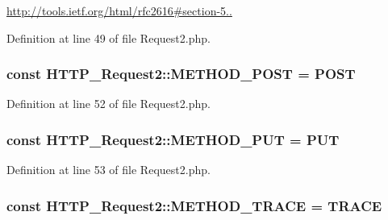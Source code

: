 \hyperlink{}{http\+://tools.\+ietf.\+org/html/rfc2616\#section-\/5..}

Definition at line 49 of file Request2.\+php.

\subsubsection[{\texorpdfstring{M\+E\+T\+H\+O\+D\+\_\+\+P\+O\+ST}{METHOD_POST}}]{\setlength{\rightskip}{0pt plus 5cm}const H\+T\+T\+P\+\_\+\+Request2\+::\+M\+E\+T\+H\+O\+D\+\_\+\+P\+O\+ST = \textquotesingle{}P\+O\+ST\textquotesingle{}}\hypertarget{classHTTP__Request2_ae42a6ae396ef8abacf8e54a64a64df22}{}\label{classHTTP__Request2_ae42a6ae396ef8abacf8e54a64a64df22}


Definition at line 52 of file Request2.\+php.

\subsubsection[{\texorpdfstring{M\+E\+T\+H\+O\+D\+\_\+\+P\+UT}{METHOD_PUT}}]{\setlength{\rightskip}{0pt plus 5cm}const H\+T\+T\+P\+\_\+\+Request2\+::\+M\+E\+T\+H\+O\+D\+\_\+\+P\+UT = \textquotesingle{}P\+UT\textquotesingle{}}\hypertarget{classHTTP__Request2_a02fd90821d762476b8ec1e226c374174}{}\label{classHTTP__Request2_a02fd90821d762476b8ec1e226c374174}


Definition at line 53 of file Request2.\+php.

\subsubsection[{\texorpdfstring{M\+E\+T\+H\+O\+D\+\_\+\+T\+R\+A\+CE}{METHOD_TRACE}}]{\setlength{\rightskip}{0pt plus 5cm}const H\+T\+T\+P\+\_\+\+Request2\+::\+M\+E\+T\+H\+O\+D\+\_\+\+T\+R\+A\+CE = \textquotesingle{}T\+R\+A\+CE\textquotesingle{}}\hypertarget{classHTTP__Request2_a9877a1980431a869bce427ec64c923eb}{}\label{classHTTP__Request2_a9877a1980431a869bce427ec64c923eb}



